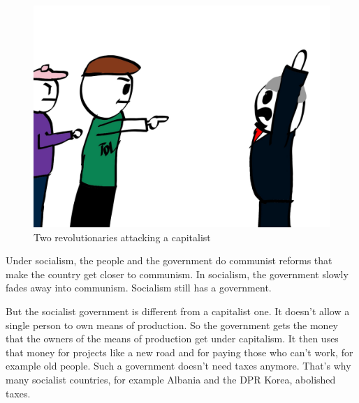 \documentclass[a4paper]{book} %
\begin{document}
\begin{figure}[tbhp]
\centering
\includegraphics[height=0.3\textheight]{3-1.png}
\caption{Two revolutionaries attacking a capitalist}
\end{figure}

\newpage

Under socialism, the people and the government do communist reforms that make the country get closer to communism. In socialism, the government slowly fades away into communism. Socialism still has a government.

But the socialist government is different from a capitalist one. It doesn't allow a single person to own means of production. So the government gets the money that the owners of the means of production get under capitalism. It then uses that money for projects like a new road and for paying those who can't work, for example old people. Such a government doesn't need taxes anymore. That's why many socialist countries, for example Albania and the DPR Korea, abolished taxes.
\end{document}
